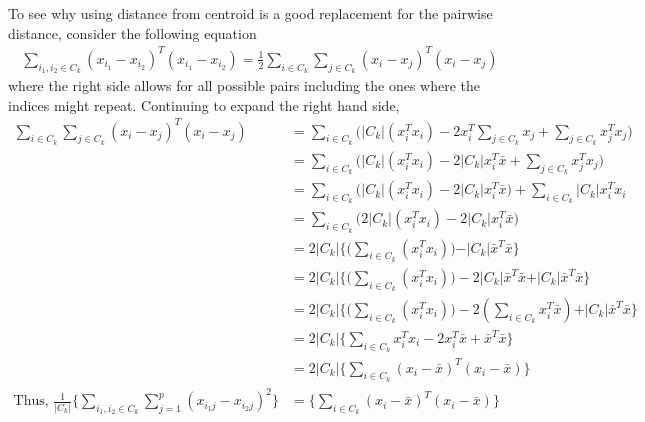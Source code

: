 \documentclass[11pt, a4paper]{article}
\begin{document}
    To see why using distance from centroid is a good replacement for the pairwise distance, consider the following equation
    \begin{align*}
        \sum_{i_{1}, i_{2} \in C_{k}} (x_{i_{1}} - x_{i_{2}})^{T} (x_{i_{1}} - x_{i_{2}}) = \frac{1}{2} \sum_{i \in C_{k}} \sum_{j \in C_{k}} (x_{i} - x_{j})^{T}(x_{i} - x_{j})
    \end{align*}
    where the right side allows for all possible pairs including the ones where the indices might repeat. Continuing to expand the right hand side,
    \begin{align*}
        \sum_{i \in C_{k}} \sum_{j \in C_{k}} (x_{i} - x_{j})^{T}(x_{i} - x_{j}) &= \sum_{i \in C_{k}} \bigg(\vert C_{k} \vert (x_{i}^{T} x_{i}) - 2x_{i}^{T} \sum_{j \in C_{k}} x_{j} + \sum_{j \in C_{k}} x_{j}^{T} x_{j} \bigg)\\
        &= \sum_{i \in C_{k}} \bigg( \vert C_{k} \vert (x_{i}^{T} x_{i}) - 2\vert C_{k} \vert x_{i}^{T} \bar{x} + \sum_{j \in C_{k}} x_{j}^{T} x_{j} \bigg)\\
        &= \sum_{i \in C_{k}} \bigg( \vert C_{k} \vert (x_{i}^{T} x_{i}) - 2\vert C_{k} \vert x_{i}^{T} \bar{x} \bigg) + \sum_{i \in C_{k}} \vert C_{k} \vert x_{i}^{T} x_{i}\\
        &= \sum_{i \in C_{k}} \bigg( 2\vert C_{k} \vert (x_{i}^{T} x_{i}) - 2\vert C_{k} \vert x_{i}^{T} \bar{x} \bigg)\\
        &= 2 \vert C_{k} \vert \bigg\{ \bigg( \sum_{i \in C_{k}}  (x_{i}^{T} x_{i}) \bigg) - \vert C_{k} \vert \bar{x}^{T} \bar{x} \bigg\}\\
        &= 2 \vert C_{k} \vert \bigg\{ \bigg( \sum_{i \in C_{k}}  (x_{i}^{T} x_{i}) \bigg) - 2\vert C_{k} \vert \bar{x}^{T} \bar{x} + \vert C_{k} \vert \bar{x}^{T} \bar{x} \bigg\}\\
        &= 2 \vert C_{k} \vert \bigg\{ \bigg( \sum_{i \in C_{k}}  (x_{i}^{T} x_{i}) \bigg) - 2 (\sum_{i \in C_{k}} x_{i}^{T} \bar{x}) + \vert C_{k} \vert \bar{x}^{T} \bar{x} \bigg\}\\
        &= 2 \vert C_{k} \vert \bigg\{ \sum_{i \in C_{k}}  x_{i}^{T} x_{i} - 2 x_{i}^{T} \bar{x} + \bar{x}^{T} \bar{x} \bigg\}\\
        &= 2 \vert C_{k} \vert \bigg\{ \sum_{i \in C_{k}}  (x_{i} - \bar{x})^{T} (x_{i} - \bar{x}) \bigg\}\\
        \text{Thus, } \frac{1}{\vert C_{k} \vert} \bigg\{\sum_{i_{1}, i_{2} \in C_{k}} \sum_{j=1}^{p} (x_{i_{1}j} - x_{i_{2}j})^{2} \bigg \} &= \bigg\{ \sum_{i \in C_{k}}  (x_{i} - \bar{x})^{T} (x_{i} - \bar{x}) \bigg\}
    \end{align*}
\end{document}
